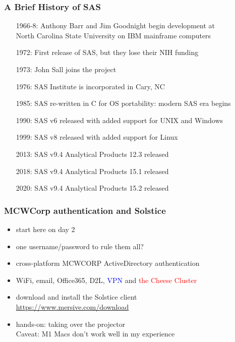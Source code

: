 \documentclass[11pt,pdftex,dvipsnames,usenames,helvetica]{beamer}
\begin{document}
\begin{frame}
\frametitle{A Brief History of SAS}

\begin{itemize}
\item[1966-8:] Anthony Barr and Jim Goodnight begin development at\\
 North Carolina State University on IBM mainframe computers
\item[1972:] First release of SAS, but they lose their NIH funding 
\item[1973:] John Sall joins the project
\item[1976:] SAS Institute is incorporated in Cary, NC
\item[1985:] SAS re-written in C for OS portability: modern SAS era begins
\item[1990:] SAS v6 released with added support for UNIX and Windows
\item[1999:] SAS v8 released with added support for Linux
\item[2013:] SAS v9.4 Analytical Products 12.3 released
\item[2018:] SAS v9.4 Analytical Products 15.1 released
\item[2020:] SAS v9.4 Analytical Products 15.2 released
\end{itemize}

\end{frame}

\begin{frame}
\frametitle{MCWCorp authentication and Solstice}

\begin{itemize}
\item start here on day 2
\item one username/password to rule them all?
\item cross-platform MCWCORP ActiveDirectory authentication
\item WiFi, email, Office365, D2L, \textcolor{blue}{VPN} and 
\textcolor{red}{the Cheese Cluster}
\item download and install the Solstice client\\
\url{https://www.mersive.com/download}
\item hands-on: taking over the projector\\
Caveat: M1 Macs don't work well in my experience 
\end{itemize}

\end{frame}
\end{document}
